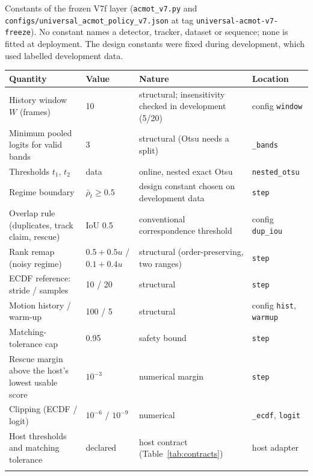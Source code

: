 \begin{tableorg}[!htbp]
\centering
\caption{Constants of the frozen V7f layer (\texttt{acmot\_v7.py} and \texttt{configs/universal\_acmot\_policy\_v7.json} at tag \texttt{universal-acmot-v7-freeze}). No constant names a detector, tracker, dataset or sequence; none is fitted at deployment. The design constants were fixed during development, which used labelled development data.}
\label{tab:constants}
\footnotesize
\setlength\tabcolsep{3.5pt}
\begin{adjustbox}{max width=\linewidth}
\begin{tabular}{p{3.7cm}p{2.0cm}p{4.0cm}p{2.6cm}}
\toprule
Quantity & Value & Nature & Location \\
\midrule
History window $W$ (frames) & 10 & structural; insensitivity checked in development (5/20) & config \texttt{window} \\
Minimum pooled logits for valid bands & 3 & structural (Otsu needs a split) & \texttt{\_bands} \\
Thresholds $t_1$, $t_2$ & data & online, nested exact Otsu & \texttt{nested\_otsu} \\
Regime boundary & $\bar\rho_t \geq 0.5$ & design constant chosen on development data & \texttt{step} \\
Overlap rule (duplicates, track claim, rescue) & IoU 0.5 & conventional correspondence threshold & config \texttt{dup\_iou} \\
Rank remap (noisy regime) & $0.5+0.5u$ / $0.1+0.4u$ & structural (order-preserving, two ranges) & \texttt{step} \\
ECDF reference: stride / samples & 10 / 20 & structural & \texttt{step} \\
Motion history / warm-up & 100 / 5 & structural & config \texttt{hist}, \texttt{warmup} \\
Matching-tolerance cap & 0.95 & safety bound & \texttt{step} \\
Rescue margin above the host's lowest usable score & $10^{-3}$ & numerical margin & \texttt{step} \\
Clipping (ECDF / logit) & $10^{-6}$ / $10^{-9}$ & numerical & \texttt{\_ecdf}, \texttt{logit} \\
Host thresholds and matching tolerance & declared & host contract (Table~\ref{tab:contracts}) & host adapter \\
\botrule
\end{tabular}
\end{adjustbox}
\end{tableorg}
